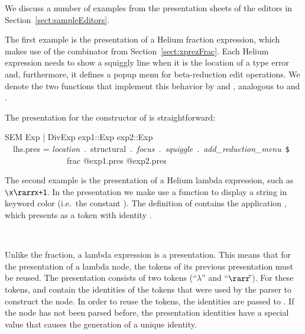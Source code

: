
We discuss a number of examples from the presentation sheets of the editors in Section~\ref{sect:sampleEditors}.


The first example is the presentation of a Helium fraction expression, which makes use of the  combinator from Section~\ref{sect:xprezFrac}. Each Helium expression needs to show a squiggly line when it is the location of a type error and, furthermore, it defines a popup menu for beta-reduction edit operations. We denote the two functions that implement this behavior by  and , analogous to  and . 

The presentation for the  constructor of  is straightforward:

\ttfamily\begin{small}\begin{tabbing}
SEM Exp | DivExp exp1::Exp exp2::Exp \\
~~lhs.pres = {\em location}~.~structural~.~{\em focus}~.~{\em squiggle}~.~{\em add\_reduction\_menu}~\verb|$|\\
~~~~~~~~~~~~~~~frac @exp1.pres @exp2.pres
\end{tabbing}\end{small}\rmfamily


The second example is the presentation of a Helium lambda expression, such as \verb|\x|$\rarr\!$\verb|x+1|. In the presentation we make  use a function  to display a string in keyword color (i.e.\ the constant ). The definition of  contains the application , which  presents  as a token with identity .

\begin{small}
\\
\end{small}

Unlike the fraction, a lambda expression is a  presentation. This means that for the presentation of a lambda node, the tokens of its previous presentation must be reused. The presentation consists of two tokens (``$\lambda$'' and ``$\rarr\!\!$''). For these tokens,  and  contain the identities of the tokens that were used by the parser to construct the node. In order to reuse the tokens, the identities are passed to . If the node has not been parsed before, the presentation identities have a special value that causes the generation of a unique identity. 

